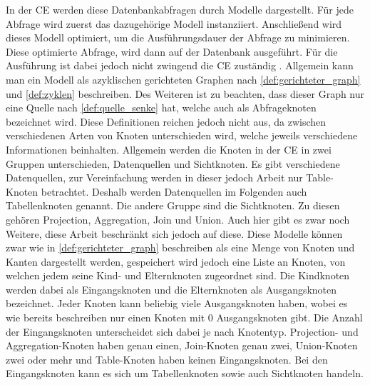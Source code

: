 In der \ac{CE} werden diese Datenbankabfragen durch Modelle dargestellt. Für
jede Abfrage wird zuerst das dazugehörige Modell instanziiert. Anschließend
wird dieses Modell optimiert, um die Ausführungsdauer der Abfrage zu
minimieren. Diese optimierte Abfrage, wird dann auf der Datenbank ausgeführt.
Für die Ausführung ist dabei jedoch nicht zwingend die \ac{CE} zuständig
\autocite[vgl.][]{SapHanaExecutionEngines}.
Allgemein kann man ein Modell als azyklischen gerichteten Graphen nach
\autoref{def:gerichteter_graph} und \autoref{def:zyklen} beschreiben. Des
Weiteren ist zu beachten, dass dieser Graph nur eine Quelle nach
\autoref{def:quelle_senke} hat, welche auch als Abfrageknoten bezeichnet wird.
Diese Definitionen reichen jedoch nicht aus, da zwischen verschiedenen Arten
von Knoten unterschieden wird, welche jeweils verschiedene Informationen
beinhalten.  Allgemein werden die Knoten in der \ac{CE} in zwei Gruppen
unterschieden, Datenquellen und Sichtknoten. Es gibt verschiedene Datenquellen,
zur Vereinfachung werden in dieser jedoch Arbeit nur
\foreignlanguage{english}{Table}-Knoten betrachtet. Deshalb werden Datenquellen
im Folgenden auch Tabellenknoten genannt.
Die andere Gruppe sind die Sichtknoten. Zu diesen gehören \zB
\foreignlanguage{english}{Projection}, \foreignlanguage{english}{Aggregation},
\foreignlanguage{english}{Join} und \foreignlanguage{english}{Union}. Auch hier
gibt es zwar noch Weitere, diese Arbeit beschränkt sich jedoch auf diese.
Diese Modelle können zwar wie in \autoref{def:gerichteter_graph}
beschreiben als eine Menge von Knoten und Kanten dargestellt werden, gespeichert wird
jedoch eine Liste an Knoten, von welchen jedem seine Kind- und Elternknoten
zugeordnet sind. Die Kindknoten werden dabei als Eingangsknoten und die
Elternknoten als Ausgangsknoten bezeichnet. Jeder Knoten kann beliebig viele
Ausgangsknoten haben, wobei es wie bereits beschreiben nur einen Knoten mit $0$
Ausgangsknoten gibt. Die Anzahl der Eingangsknoten unterscheidet sich dabei je
nach Knotentyp.
\foreignlanguage{english}{Projection}- und
\foreignlanguage{english}{Aggregation}-Knoten haben genau einen,
\foreignlanguage{english}{Join}-Knoten genau zwei,
\foreignlanguage{english}{Union}-Knoten zwei oder mehr und
\foreignlanguage{english}{Table}-Knoten haben keinen Eingangsknoten.
Bei den Eingangsknoten kann es sich um Tabellenknoten
sowie auch Sichtknoten handeln. \autocite[Vgl.][]{SapHanaSupportedViewNodes}

